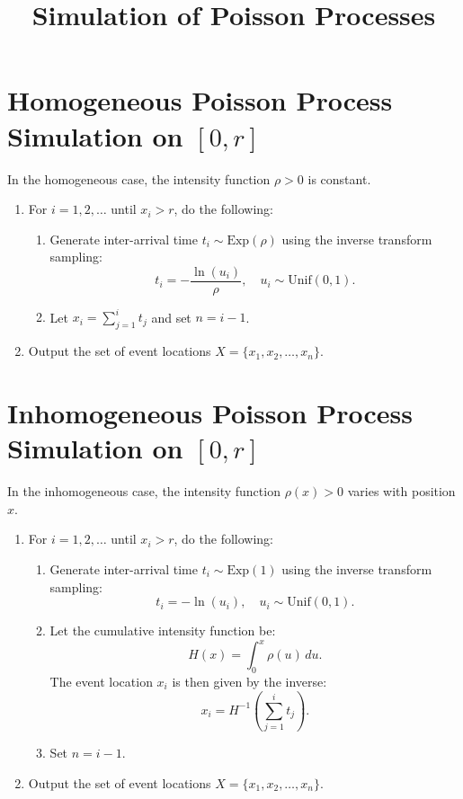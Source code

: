 \documentclass{article}
\begin{document}
\title{Simulation of Poisson Processes}

\section*{Homogeneous Poisson Process Simulation on $[0, r]$}

In the homogeneous case, the intensity function \( \rho > 0 \) is constant.

\begin{enumerate}
    \item For \( i = 1, 2, \dots \) until \( x_i > r \), do the following:
    \begin{enumerate}
        \item Generate inter-arrival time \( t_i \sim \text{Exp}(\rho) \) using the inverse transform sampling:
        \[
        t_i = -\frac{\ln(u_i)}{\rho}, \quad u_i \sim \text{Unif}(0, 1).
        \]
        \item Let \( x_i = \sum_{j=1}^i t_j \) and set \( n = i - 1 \).
    \end{enumerate}
    \item Output the set of event locations \( X = \{x_1, x_2, \dots, x_n\} \).
\end{enumerate}

\section*{Inhomogeneous Poisson Process Simulation on $[0, r]$}

In the inhomogeneous case, the intensity function \( \rho(x) > 0 \) varies with position \( x \).

\begin{enumerate}
    \item For \( i = 1, 2, \dots \) until \( x_i > r \), do the following:
    \begin{enumerate}
        \item Generate inter-arrival time \( t_i \sim \text{Exp}(1) \) using the inverse transform sampling:
        \[
        t_i = -\ln(u_i), \quad u_i \sim \text{Unif}(0, 1).
        \]
        \item Let the cumulative intensity function be:
        \[
        H(x) = \int_0^x \rho(u) \, du.
        \]
        The event location \( x_i \) is then given by the inverse:
        \[
        x_i = H^{-1} \left( \sum_{j=1}^i t_j \right).
        \]
        \item Set \( n = i - 1 \).
    \end{enumerate}
    \item Output the set of event locations \( X = \{x_1, x_2, \dots, x_n\} \).
\end{enumerate}
\end{document}
